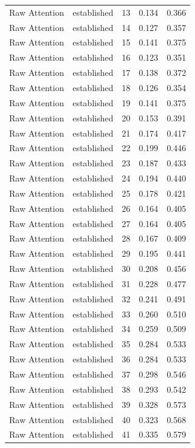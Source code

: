 \begin{tabular}{llrrr}
Raw Attention & established & 13 & 0.134 & 0.366 \\
Raw Attention & established & 14 & 0.127 & 0.357 \\
Raw Attention & established & 15 & 0.141 & 0.375 \\
Raw Attention & established & 16 & 0.123 & 0.351 \\
Raw Attention & established & 17 & 0.138 & 0.372 \\
Raw Attention & established & 18 & 0.126 & 0.354 \\
Raw Attention & established & 19 & 0.141 & 0.375 \\
Raw Attention & established & 20 & 0.153 & 0.391 \\
Raw Attention & established & 21 & 0.174 & 0.417 \\
Raw Attention & established & 22 & 0.199 & 0.446 \\
Raw Attention & established & 23 & 0.187 & 0.433 \\
Raw Attention & established & 24 & 0.194 & 0.440 \\
Raw Attention & established & 25 & 0.178 & 0.421 \\
Raw Attention & established & 26 & 0.164 & 0.405 \\
Raw Attention & established & 27 & 0.164 & 0.405 \\
Raw Attention & established & 28 & 0.167 & 0.409 \\
Raw Attention & established & 29 & 0.195 & 0.441 \\
Raw Attention & established & 30 & 0.208 & 0.456 \\
Raw Attention & established & 31 & 0.228 & 0.477 \\
Raw Attention & established & 32 & 0.241 & 0.491 \\
Raw Attention & established & 33 & 0.260 & 0.510 \\
Raw Attention & established & 34 & 0.259 & 0.509 \\
Raw Attention & established & 35 & 0.284 & 0.533 \\
Raw Attention & established & 36 & 0.284 & 0.533 \\
Raw Attention & established & 37 & 0.298 & 0.546 \\
Raw Attention & established & 38 & 0.293 & 0.542 \\
Raw Attention & established & 39 & 0.328 & 0.573 \\
Raw Attention & established & 40 & 0.323 & 0.568 \\
Raw Attention & established & 41 & 0.335 & 0.579 \\

\end{tabular}

